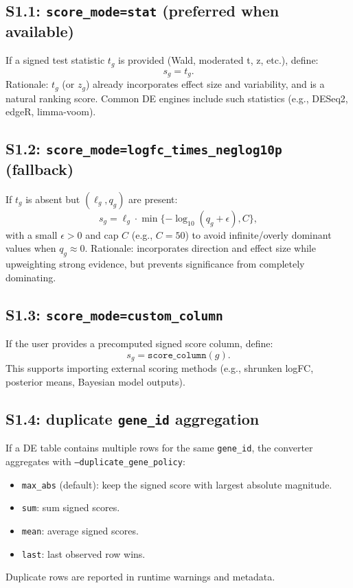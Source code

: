 \documentclass[11pt]{article}
\begin{document}
\subsection{S1.1: \texttt{score\_mode=stat} (preferred when available)}
If a signed test statistic $t_g$ is provided (Wald, moderated t, z, etc.), define:
\[
s_g = t_g.
\]
Rationale: $t_g$ (or $z_g$) already incorporates effect size and variability, and is a natural ranking score.
Common DE engines include such statistics (e.g., DESeq2, edgeR, limma-voom). \cite{love2014deseq2, robinson2010edger, law2014voom}

\subsection{S1.2: \texttt{score\_mode=logfc\_times\_neglog10p} (fallback)}
If $t_g$ is absent but $(\ell_g, q_g)$ are present:
\begin{equation}
s_g = \ell_g \cdot \min\{-\log_{10}(q_g + \epsilon), C\},
\label{eq:logfc_p}
\end{equation}
with a small $\epsilon > 0$ and cap $C$ (e.g., $C=50$) to avoid infinite/overly dominant values when $q_g \approx 0$.
Rationale: incorporates direction and effect size while upweighting strong evidence, but prevents significance from completely dominating.

\subsection{S1.3: \texttt{score\_mode=custom\_column}}
If the user provides a precomputed signed score column, define:
\[
s_g = \texttt{score\_column}(g).
\]
This supports importing external scoring methods (e.g., shrunken logFC, posterior means, Bayesian model outputs).

\subsection{S1.4: duplicate \texttt{gene\_id} aggregation}
If a DE table contains multiple rows for the same \texttt{gene\_id}, the converter aggregates with
\texttt{--duplicate\_gene\_policy}:
\begin{itemize}[leftmargin=2em]
\item \texttt{max\_abs} (default): keep the signed score with largest absolute magnitude.
\item \texttt{sum}: sum signed scores.
\item \texttt{mean}: average signed scores.
\item \texttt{last}: last observed row wins.
\end{itemize}
Duplicate rows are reported in runtime warnings and metadata.
\end{document}
